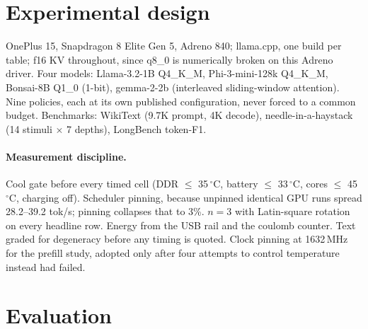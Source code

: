 \documentclass[11pt]{article}
\begin{document}
\section{Experimental design}
OnePlus 15, Snapdragon 8 Elite Gen 5, Adreno 840; llama.cpp, one build per table; f16 KV
throughout, since q8\_0 is numerically broken on this Adreno driver. Four models:
Llama-3.2-1B Q4\_K\_M, Phi-3-mini-128k Q4\_K\_M, Bonsai-8B Q1\_0 (1-bit), gemma-2-2b
(interleaved sliding-window attention). Nine policies, each at its own published
configuration, never forced to a common budget. Benchmarks: WikiText (9.7K prompt, 4K
decode), needle-in-a-haystack (14 stimuli $\times$ 7 depths), LongBench token-F1.

\paragraph{Measurement discipline.}
Cool gate before every timed cell (DDR $\le$ 35\,$^\circ$C, battery $\le$ 33\,$^\circ$C,
cores $\le$ 45\,$^\circ$C, charging off). Scheduler pinning, because unpinned identical GPU
runs spread 28.2--39.2 tok/s; pinning collapses that to 3\%. $n{=}3$ with Latin-square
rotation on every headline row. Energy from the USB rail and the coulomb counter. Text graded
for degeneracy before any timing is quoted. Clock pinning at 1632\,MHz for the prefill study,
adopted only after four attempts to control temperature instead had failed.

\section{Evaluation}
\end{document}
